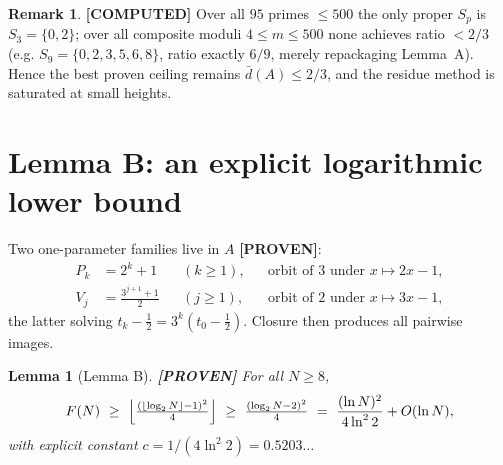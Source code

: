 \documentclass[11pt]{article}
\newtheorem{lemma}[theorem]{Lemma}
\theoremstyle{definition}
\newtheorem{remark}[theorem]{Remark}
\newcommand{\A}{A}
\newcommand{\F}{F}
\begin{document}
\begin{remark}\textbf{[COMPUTED]}
Over all $95$ primes $\le500$ the only proper $S_p$ is $S_3=\{0,2\}$; over all
composite moduli $4\le m\le500$ none achieves ratio $<2/3$ (e.g.
$S_9=\{0,2,3,5,6,8\}$, ratio exactly $6/9$, merely repackaging Lemma~A).
Hence the best proven ceiling remains $\bar d(\A)\le 2/3$, and the residue
method is saturated at small heights.
\end{remark}

\section{Lemma B: an explicit logarithmic lower bound}\label{sec:lemmaB}

Two one-parameter families live in $\A$ \textbf{[PROVEN]}:
\begin{align}
P_k &= 2^k+1 && (k\ge1), && \text{orbit of }3\text{ under }x\mapsto 2x-1,\\
V_j &= \tfrac{3^{j+1}+1}{2} && (j\ge1), && \text{orbit of }2\text{ under }x\mapsto 3x-1 ,
\end{align}
the latter solving $t_k-\tfrac12=3^k(t_0-\tfrac12)$. Closure then produces all
pairwise images.

\begin{lemma}[Lemma B]\label{lem:B}\textbf{[PROVEN]}
For all $N\ge8$,
\[
\F(N)\ \ge\ \Bigl\lfloor\tfrac{(\lfloor\log_2 N\rfloor-1)^2}{4}\Bigr\rfloor
\ \ge\ \tfrac{(\log_2 N-2)^2}{4}
\ =\ \frac{(\ln N)^2}{4\ln^2 2}+O(\ln N),
\]
with explicit constant $c=1/(4\ln^2 2)=0.5203\ldots$
\end{lemma}
\end{document}
